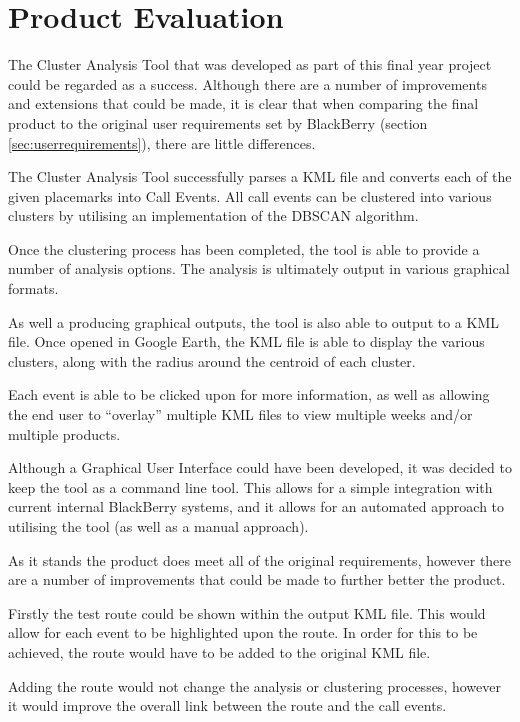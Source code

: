 \section{Product Evaluation}
\label{sec:product_evaluation}

The Cluster Analysis Tool that was developed as part of this final year project
could be regarded as a success. Although there are a number of improvements and
extensions that could be made, it is clear that when comparing the final 
product to the original user requirements set by BlackBerry (section 
\ref{sec:userrequirements}), there are little differences.

The Cluster Analysis Tool successfully parses a KML file and converts each of 
the given placemarks into Call Events. All call events can be clustered into 
various clusters by utilising an implementation of the DBSCAN algorithm.

Once the clustering process has been completed, the tool is able to provide a 
number of analysis options. The analysis is ultimately output in various 
graphical formats.

As well a producing graphical outputs, the tool is also able to output to a 
KML file. Once opened in Google Earth, the KML file is able to display the 
various clusters, along with the radius around the centroid of each cluster. 

Each event is able to be clicked upon for more information, as well as allowing
the end user to ``overlay'' multiple KML files to view multiple weeks and/or 
multiple products.

Although a Graphical User Interface could have been developed, it was decided 
to keep the tool as a command line tool. This allows for a simple integration
with current internal BlackBerry systems, and it allows for an automated 
approach to utilising the tool (as well as a manual approach).

As it stands the product does meet all of the original requirements, however 
there are a number of improvements that could be made to further better the 
product.

Firstly the test route could be shown within the output KML file. This would 
allow for each event to be highlighted upon the route. In order for this to be 
achieved, the route would have to be added to the original KML file. 

Adding the route would not change the analysis or clustering processes, however
it would improve the overall link between the route and the call events.

